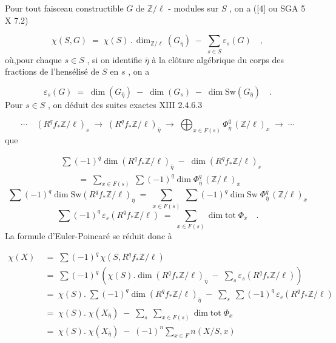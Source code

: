
Pour tout faisceau constructible $G$ de $\mathbb{Z}/\ell$ - modules sur $S$ , on a ([4] ou SGA 5 X 7.2)

\begin{equation*}
\chi(S,G) \; = \; \chi(S) \, . \, \dim_{\mathbb{Z}/\ell}(G_{\bar{\eta}}) \; - \; \sum_{s \in S} \varepsilon_s(G) \quad ,
\end{equation*}
où,pour chaque $s \in S$ , si on identifie $\bar{\eta}$ à la clôture algébrique du corps des fractions de l'hensélisé de $S$ en $s$ , on a

\begin{equation*}
\varepsilon_s(G) \; = \; \dim(G_{\bar{\eta}}) \; - \; \dim(G_s) \; - \; \dim \mathrm{Sw}(G_{\bar{\eta}}) \quad .
\end{equation*}
Pour $s \in S$ , on déduit des suites exactes XIII 2.4.6.3

\begin{equation*}
\cdots \quad (R^q f_* \mathbb{Z}/\ell)_s \; \longrightarrow \; (R^q f_* \mathbb{Z}/\ell)_{\bar{\eta}} \; \longrightarrow \; \bigoplus_{x \in F(s)} \Phi^q_{\bar{\eta}} \, (\mathbb{Z}/\ell)_x \; \longrightarrow \; \cdots
\end{equation*}
que

\begin{equation*}
\begin{aligned} &\sum (-1)^q \dim(R^q f_* \mathbb{Z}/\ell)_{\bar{\eta}} \; - \; \dim(R^q f_* \mathbb{Z}/\ell)_s \\[1ex] &\qquad = \; \sum_{x \in F(s)} \; \sum (-1)^q \dim \Phi^q_{\bar{\eta}} \, (\mathbb{Z}/\ell)_x \end{aligned}
\end{equation*}
\begin{equation*}
\sum (-1)^q \dim \mathrm{Sw}(R^q f_* \mathbb{Z}/\ell)_{\bar{\eta}} \; = \; \sum_{x \in F(s)} \; \sum (-1)^q \dim \mathrm{Sw} \; \Phi^q_{\bar{\eta}} \, (\mathbb{Z}/\ell)_x
\end{equation*}
\begin{equation}\tag{c}
\sum (-1)^q \, \varepsilon_s(R^q f_* \mathbb{Z}/\ell) \; = \; \sum_{x \in F(s)} \dim \mathrm{tot} \; \Phi_x \quad .
\end{equation}
La formule d'Euler-Poincaré se réduit donc à

\begin{equation*}
\begin{aligned} \chi(X) \; &= \; \sum (-1)^q \, \chi(S,R^q f_* \mathbb{Z}/\ell) \\[1ex] &= \; \sum (-1)^q \, (\chi(S).\dim(R^q f_* \mathbb{Z}/\ell)_{\bar{\eta}} \; - \; \sum_s \varepsilon_s(R^q f_* \mathbb{Z}/\ell)) \\[1ex] &= \; \chi(S). \; \sum (-1)^q \dim(R^q f_* \mathbb{Z}/\ell)_{\bar{\eta}} \; - \; \sum_s \; \sum (-1)^q \, \varepsilon_s(R^q f_* \mathbb{Z}/\ell) \\[1ex] &= \; \chi(S). \; \chi(X_{\bar{\eta}}) \; - \; \sum_s \; \sum_{x \in F(s)} \dim \mathrm{tot} \; \Phi_x \\[1ex] &= \; \chi(S). \; \chi(X_{\bar{\eta}}) \; - \; (-1)^n \sum_{x \in F} n(X/S,x) \end{aligned}
\end{equation*}

